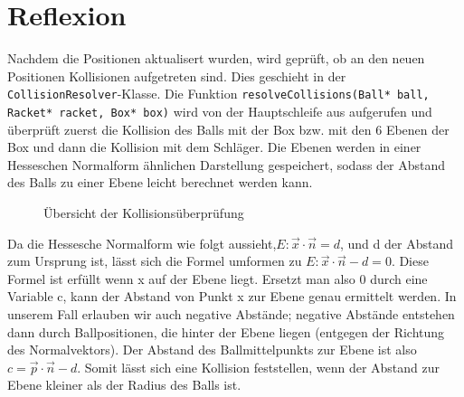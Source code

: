 \section{Reflexion}
\label{Kapitel_4_-_Unterkapitel_2}

Nachdem die Positionen aktualisert wurden, wird geprüft, ob an den neuen Positionen Kollisionen aufgetreten sind. Dies geschieht in der {\texttt{CollisionResolver}}-Klasse. Die Funktion {\texttt{resolveCollisions(Ball* ball, Racket* racket, Box* box)}} wird von der Hauptschleife aus aufgerufen und überprüft zuerst die Kollision des Balls mit der Box bzw. mit den 6 Ebenen der Box und dann die Kollision mit dem Schläger.
Die Ebenen werden in einer Hesseschen Normalform ähnlichen Darstellung gespeichert, sodass der Abstand des Balls zu einer Ebene leicht berechnet werden kann.

\begin{figure}[h]
    \caption{Übersicht der Kollisionsüberprüfung}
        \label{fig_testbild}
\end{figure} 

Da die Hessesche Normalform wie folgt aussieht,$ E: \vec x \cdot \vec n  = d $, und d der Abstand zum Ursprung ist, lässt sich die Formel umformen zu $ E: \vec x \cdot \vec n  - d = 0$. Diese Formel ist erfüllt wenn x auf der Ebene liegt. Ersetzt man also 0 durch eine Variable c, kann der Abstand von Punkt x zur Ebene genau ermittelt werden. In unserem Fall erlauben wir auch negative Abstände; negative Abstände entstehen dann durch Ballpositionen, die hinter der Ebene liegen (entgegen der Richtung des Normalvektors).
Der Abstand des Ballmittelpunkts zur Ebene ist also $c = \vec p\cdot \vec n - d $. Somit lässt sich eine Kollision feststellen, wenn der Abstand zur Ebene kleiner als der Radius des Balls ist.

